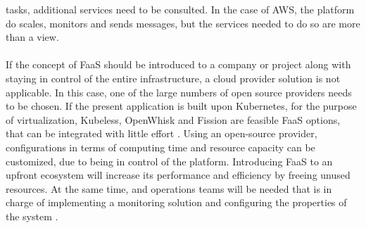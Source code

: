 \documentclass[11pt]{article}
\begin{document}
tasks, additional services need to be consulted. In the case of AWS, the platform do scales, monitors and sends messages, but the services needed to do so are more than a view.\\\\If the concept of FaaS should be introduced to a company or project along with staying in control of the entire infrastructure, a cloud provider solution is not applicable. In this case, one of the large numbers of open source providers needs to be chosen. If the present application is built upon Kubernetes, for the purpose of virtualization, Kubeless, OpenWhisk and Fission are feasible FaaS options, that can be integrated with little effort \cite{palade2019evaluation}. Using an open-source provider, configurations in terms of computing time and resource capacity can be customized, due to being in control of the platform. Introducing FaaS to an upfront ecosystem will increase its performance and efficiency by freeing unused resources. At the same time, and operations teams will be needed that is in charge of implementing a monitoring solution and configuring the properties of the system \cite{mohanty2018evaluation}.\\\\ 
\end{document}

